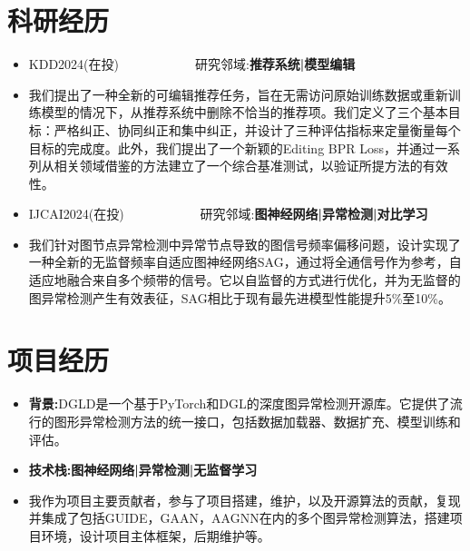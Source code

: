 \documentclass{resume}
\begin{document}
\section{科研经历}
\begin{itemize}
    \item KDD2024(在投)\ \ \ \ \ \ \ \ \ \ \ \ 研究邻域:\textbf{推荐系统|模型编辑}
    \item 我们提出了一种全新的可编辑推荐任务，旨在无需访问原始训练数据或重新训练模型的情况下，从推荐系统中删除不恰当的推荐项。我们定义了三个基本目标：严格纠正、协同纠正和集中纠正，并设计了三种评估指标来定量衡量每个目标的完成度。此外，我们提出了一个新颖的Editing BPR Loss，并通过一系列从相关领域借鉴的方法建立了一个综合基准测试，以验证所提方法的有效性。

\end{itemize}
\begin{itemize}
    \item IJCAI2024(在投)\ \ \ \ \ \ \ \ \ \ \ \ 研究邻域:\textbf{图神经网络|异常检测|对比学习}
    \item 我们针对图节点异常检测中异常节点导致的图信号频率偏移问题，设计实现了一种全新的无监督频率自适应图神经网络SAG，通过将全通信号作为参考，自适应地融合来自多个频带的信号。它以自监督的方式进行优化，并为无监督的图异常检测产生有效表征，SAG相比于现有最先进模型性能提升5\%至10\%。
\end{itemize}


\section{项目经历}
\begin{itemize}
    \item \textbf{背景:}DGLD是一个基于PyTorch和DGL的深度图异常检测开源库。它提供了流行的图形异常检测方法的统一接口，包括数据加载器、数据扩充、模型训练和评估。
    \item \textbf{技术栈:图神经网络|异常检测|无监督学习}
    \item 我作为项目主要贡献者，参与了项目搭建，维护，以及开源算法的贡献，复现并集成了包括GUIDE，GAAN，AAGNN在内的多个图异常检测算法，搭建项目环境，设计项目主体框架，后期维护等。
\end{itemize}
\end{document}
